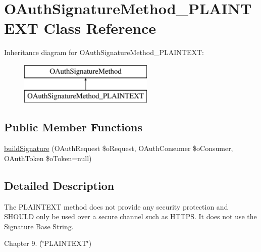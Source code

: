 \hypertarget{class_o_auth_signature_method___p_l_a_i_n_t_e_x_t}{\section{O\-Auth\-Signature\-Method\-\_\-\-P\-L\-A\-I\-N\-T\-E\-X\-T Class Reference}
\label{class_o_auth_signature_method___p_l_a_i_n_t_e_x_t}
}
Inheritance diagram for O\-Auth\-Signature\-Method\-\_\-\-P\-L\-A\-I\-N\-T\-E\-X\-T\-:\begin{figure}[H]
\begin{center}
\leavevmode
\includegraphics[height=2.000000cm]{class_o_auth_signature_method___p_l_a_i_n_t_e_x_t}
\end{center}
\end{figure}
\subsection*{Public Member Functions}
\begin{DoxyCompactItemize}
\item 
\hyperlink{class_o_auth_signature_method___p_l_a_i_n_t_e_x_t_ab1140b04de8f27425d3bedfde97ac2a0}{build\-Signature} (O\-Auth\-Request \$o\-Request, O\-Auth\-Consumer \$o\-Consumer, O\-Auth\-Token \$o\-Token=null)
\end{DoxyCompactItemize}


\subsection{Detailed Description}
The P\-L\-A\-I\-N\-T\-E\-X\-T method does not provide any security protection and S\-H\-O\-U\-L\-D only be used over a secure channel such as H\-T\-T\-P\-S. It does not use the Signature Base String.
\begin{DoxyItemize}
\item Chapter 9. (\char`\"{}\-P\-L\-A\-I\-N\-T\-E\-X\-T\char`\"{}) 
\end{DoxyItemize}

